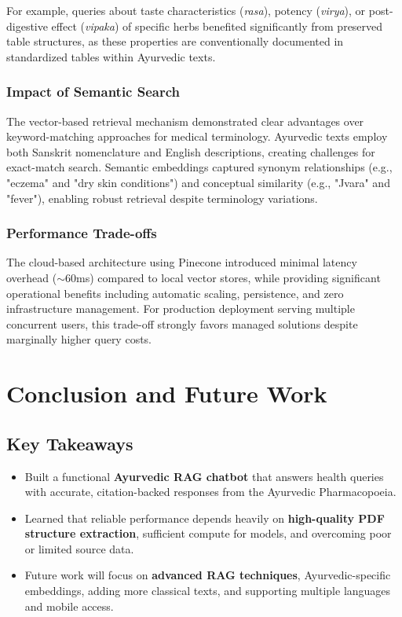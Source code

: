 \documentclass[conference]{IEEEtran}
\begin{document}
For example, queries about taste characteristics (\textit{rasa}), potency (\textit{virya}), or post-digestive effect (\textit{vipaka}) of specific herbs benefited significantly from preserved table structures, as these properties are conventionally documented in standardized tables within Ayurvedic texts.

\subsubsection{Impact of Semantic Search}
The vector-based retrieval mechanism demonstrated clear advantages over keyword-matching approaches for medical terminology. Ayurvedic texts employ both Sanskrit nomenclature and English descriptions, creating challenges for exact-match search. Semantic embeddings captured synonym relationships (e.g., "eczema" and "dry skin conditions") and conceptual similarity (e.g., "Jvara" and "fever"), enabling robust retrieval despite terminology variations.

\subsubsection{Performance Trade-offs}
The cloud-based architecture using Pinecone introduced minimal latency overhead ($\sim$60ms) compared to local vector stores, while providing significant operational benefits including automatic scaling, persistence, and zero infrastructure management. For production deployment serving multiple concurrent users, this trade-off strongly favors managed solutions despite marginally higher query costs.

\section{Conclusion and Future Work}

\subsection{Key Takeaways}
\begin{itemize}
    \item Built a functional \textbf{Ayurvedic RAG chatbot} that answers health queries with accurate, citation-backed responses from the Ayurvedic Pharmacopoeia.
    \item Learned that reliable performance depends heavily on \textbf{high-quality PDF structure extraction}, sufficient compute for models, and overcoming poor or limited source data.
    \item Future work will focus on \textbf{advanced RAG techniques}, Ayurvedic-specific embeddings, adding more classical texts, and supporting multiple languages and mobile access.
\end{itemize}
\end{document}
